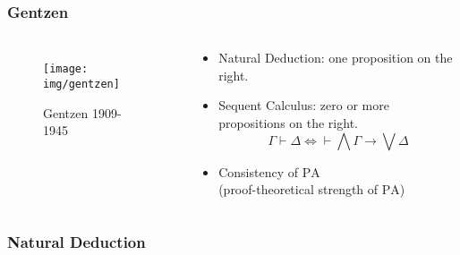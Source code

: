 \documentclass[UTF8,11pt,colorlinks,compress,openany]{beamer}%
\begin{document}
\begin{frame}\frametitle{Gentzen}
	\begin{columns}
		\vspace{-2ex}
			\begin{figure}
				\texttt{[image: img/gentzen]}\caption{Gentzen 1909-1945}
			\end{figure}
			\begin{block}{}
				\begin{itemize}
					\item Natural Deduction: one proposition on the right.
					\item Sequent Calculus: zero or more propositions on the right.
					\[\Gamma\vdash\Delta\iff\vdash\bigwedge\Gamma\to\bigvee\Delta\]
					\item Consistency of $\mathrm{PA}$\\
					(proof-theoretical strength of $\mathrm{PA}$)
				\end{itemize}
			\end{block}
	\end{columns}
\end{frame}

\begin{frame}\frametitle{Natural Deduction}
\begin{columns}
\centering
{}
\centering
{}
\centering
{}
\end{columns}
\vspace{2pt}
\hrulefill
\vspace{6pt}
\begin{columns}
\centering
{}
\centering
{}
\centering
{}
\end{columns}
\vspace{6pt}
\hrulefill
\vspace{6pt}
\begin{columns}
\centering
{}
\centering
{}
\end{columns}
\vspace{6pt}
\hrulefill
\vspace{6pt}
\begin{columns}
\centering
{}
\centering
{}
\centering
{}
\centering
{}
\end{columns}
\end{frame}
\end{document}
